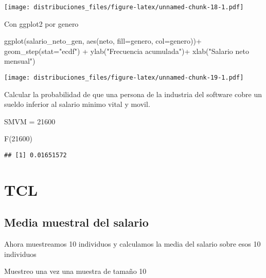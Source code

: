 \documentclass[
]{article}
\newenvironment{Shaded}{\begin{snugshade}}{\end{snugshade}}
\newcommand{\AttributeTok}[1]{\textcolor[rgb]{0.77,0.63,0.00}{#1}}
\newcommand{\DecValTok}[1]{\textcolor[rgb]{0.00,0.00,0.81}{#1}}
\newcommand{\FunctionTok}[1]{\textcolor[rgb]{0.00,0.00,0.00}{#1}}
\newcommand{\NormalTok}[1]{#1}
\newcommand{\OtherTok}[1]{\textcolor[rgb]{0.56,0.35,0.01}{#1}}
\newcommand{\SpecialCharTok}[1]{\textcolor[rgb]{0.00,0.00,0.00}{#1}}
\newcommand{\StringTok}[1]{\textcolor[rgb]{0.31,0.60,0.02}{#1}}
\begin{document}
\texttt{[image: distribuciones\_files/figure-latex/unnamed-chunk-18-1.pdf]}

Con ggplot2 por genero

\begin{Shaded}
\begin{Highlighting}[]
\FunctionTok{ggplot}\NormalTok{(salario\_neto\_gen, }\FunctionTok{aes}\NormalTok{(neto, }\AttributeTok{fill=}\NormalTok{genero, }\AttributeTok{col=}\NormalTok{genero))}\SpecialCharTok{+}
  \FunctionTok{geom\_step}\NormalTok{(}\AttributeTok{stat=}\StringTok{"ecdf"}\NormalTok{) }\SpecialCharTok{+}
  \FunctionTok{ylab}\NormalTok{(}\StringTok{"Frecuencia acumulada"}\NormalTok{)}\SpecialCharTok{+}
  \FunctionTok{xlab}\NormalTok{(}\StringTok{"Salario neto mensual"}\NormalTok{)}
\end{Highlighting}
\end{Shaded}

\texttt{[image: distribuciones\_files/figure-latex/unnamed-chunk-19-1.pdf]}

Calcular la probabilidad de que una persona de la industria del software
cobre un sueldo inferior al salario minimo vital y movil.

SMVM = 21600

\begin{Shaded}
\begin{Highlighting}[]
\FunctionTok{F}\NormalTok{(}\DecValTok{21600}\NormalTok{)}
\end{Highlighting}
\end{Shaded}

\begin{verbatim}
## [1] 0.01651572
\end{verbatim}

\hypertarget{tcl}{%
\section{TCL}\label{tcl}}

\hypertarget{media-muestral-del-salario}{%
\subsection{Media muestral del
salario}\label{media-muestral-del-salario}}

Ahora muestreamos 10 individuos y calculamos la media del salario sobre
esos 10 individuos

Muestreo una vez una muestra de tamaño 10

\begin{Shaded}
\end{Shaded}
\end{document}
